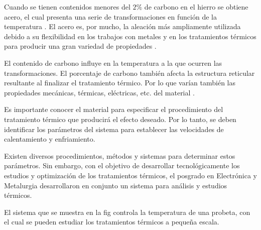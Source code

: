 


Cuando se tienen contenidos menores del $2\%$ de carbono en el hierro se obtiene acero, el cual
presenta una serie de transformaciones en función de la temperatura \cite{TratamientosAcerosTesis}.
El acero es, por mucho, la aleación más ampliamente utilizada debido a su flexibilidad en los trabajos con metales y en los tratamientos térmicos para producir una gran variedad de propiedades \cite{PracticalHeatTreating}. 



El contenido de carbono influye en la temperatura a la que ocurren las transformaciones. 
El porcentaje de carbono también afecta la estructura reticular resultante al finalizar el tratamiento térmico. 
Por lo que varían también las propiedades mecánicas, térmicas, eléctricas, etc. del material \cite{TratamientosAcerosTesis}.



Es importante conocer el material para especificar el procedimiento del tratamiento térmico que producirá el efecto deseado.
Por lo tanto, se deben identificar los parámetros del sistema
para establecer las velocidades de calentamiento y enfriamiento. 


Existen diversos procedimientos, métodos y sistemas para determinar estos parámetros. Sin embargo, con el objetivo de desarrollar tecnológicamente los estudios y optimización de los tratamientos térmicos, el posgrado en Electrónica y Metalurgia desarrollaron en conjunto un sistema para análisis y estudios térmicos.
 

El sistema que se muestra en la fig controla la temperatura de una probeta, con el cual se pueden estudiar los tratamientos térmicos a pequeña escala. 

